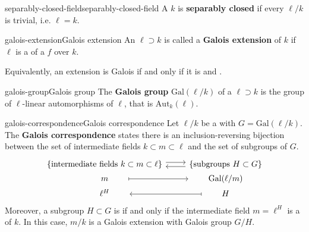 \begin{topic}{separably-closed-field}{separably-closed-field}
    A  $k$ is \textbf{separably closed} if every  $\ell/k$ is trivial, i.e. $\ell = k$.
\end{topic}

\begin{topic}{galois-extension}{Galois extension}
    An   $\ell \supset k$ is called a \textbf{Galois extension} of $k$ if $\ell$ is a  of a  $f$ over $k$.
    
    Equivalently, an extension is Galois if and only if it is  and .
\end{topic}

\begin{topic}{galois-group}{Galois group}
    The \textbf{Galois group} $\text{Gal}(\ell/k)$ of a  $\ell \supset k$ is the group of $\ell$-linear automorphisms of $\ell$, that is $\text{Aut}_k(\ell)$.
\end{topic}

\begin{topic}{galois-correspondence}{Galois correspondence}
    Let $\ell/k$ be a  with  $G = \text{Gal}(\ell/k)$. The \textbf{Galois correspondence} states there is an inclusion-reversing bijection between the set of intermediate fields $k \subset m \subset \ell$ and the set of subgroups of $G$.
    \[ \begin{tikzcd}[row sep=0em]
        \{ \text{intermediate fields } k \subset m \subset \ell \} \arrow[shift left=0.25em]{r} & \arrow[shift left=0.25em]{l} \{ \text{subgroups } H \subset G \} \\
        \qquad m \qquad  \arrow[mapsto]{r} & \qquad \text{Gal}(\ell/m) \qquad \\
        \qquad \ell^H \qquad & \arrow[mapsto]{l} \qquad H \qquad 
    \end{tikzcd} \]
    Moreover, a subgroup $H \subset G$ is  if and only if the intermediate field $m = \ell^H$ is a  of $k$. In this case, $m/k$ is a Galois extension with Galois group $G/H$.
\end{topic}

